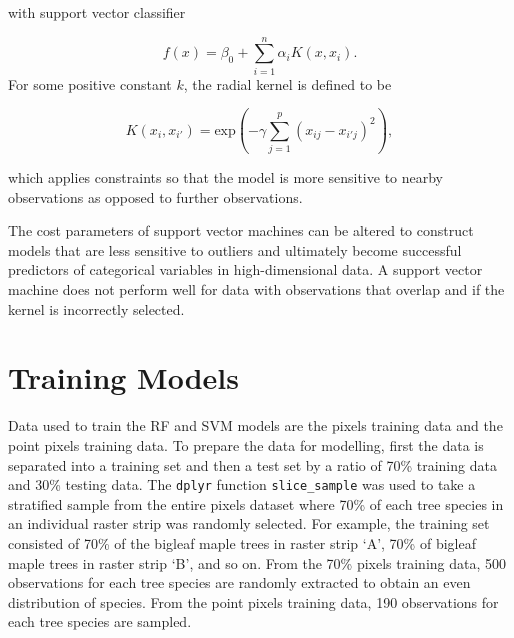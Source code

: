 \documentclass[12pt,twoside]{reedthesis}
\begin{document}
with support vector classifier

\[f(x) = \beta_0 + \sum_{i = 1}^n \alpha_i K(x, x_i).\]
For some positive constant \(k\), the radial kernel is defined to be

\[K(x_i, x_{i'}) = \mbox{exp}\left( -\gamma\sum_{j = 1}^p(x_{ij} - x_{i'j})^2 \right),\]

which applies constraints so that the model is more sensitive to nearby observations as opposed to further observations.

The cost parameters of support vector machines can be altered to construct models that are less sensitive to outliers and ultimately become successful predictors of categorical variables in high-dimensional data. A support vector machine does not perform well for data with observations that overlap and if the kernel is incorrectly selected.

\hypertarget{training-models}{%
\section{Training Models}\label{training-models}}

Data used to train the RF and SVM models are the pixels training data and the point pixels training data. To prepare the data for modelling, first the data is separated into a training set and then a test set by a ratio of 70\% training data and 30\% testing data. The \texttt{dplyr} function \texttt{slice\_sample} was used to take a stratified sample from the entire pixels dataset where 70\% of each tree species in an individual raster strip was randomly selected. For example, the training set consisted of 70\% of the bigleaf maple trees in raster strip `A', 70\% of bigleaf maple trees in raster strip `B', and so on. From the 70\% pixels training data, 500 observations for each tree species are randomly extracted to obtain an even distribution of species. From the point pixels training data, 190 observations for each tree species are sampled.
\end{document}
